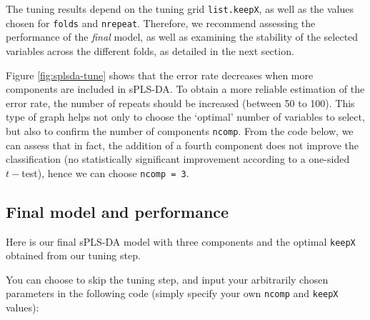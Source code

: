 \documentclass[
]{book}
\newenvironment{Shaded}{\begin{snugshade}}{\end{snugshade}}
\newcommand{\CommentTok}[1]{\textcolor[rgb]{0.56,0.35,0.01}{\textit{#1}}}
\newcommand{\NormalTok}[1]{#1}
\newcommand{\SpecialCharTok}[1]{\textcolor[rgb]{0.00,0.00,0.00}{#1}}
\begin{document}
The tuning results depend on the tuning grid \texttt{list.keepX}, as well as the values chosen for \texttt{folds} and \texttt{nrepeat}. Therefore, we recommend assessing the performance of the \emph{final} model, as well as examining the stability of the selected variables across the different folds, as detailed in the next section.

Figure \ref{fig:splsda-tune} shows that the error rate decreases when more components are included in sPLS-DA. To obtain a more reliable estimation of the error rate, the number of repeats should be increased (between 50 to 100). This type of graph helps not only to choose the `optimal' number of variables to select, but also to confirm the number of components \texttt{ncomp}. From the code below, we can assess that in fact, the addition of a fourth component does not improve the classification (no statistically significant improvement according to a one-sided \(t-\)test), hence we can choose \texttt{ncomp\ =\ 3}.

\begin{Shaded}
\end{Shaded}

\hypertarget{final-splsda-perf}{%
\subsection{Final model and performance}\label{final-splsda-perf}}

Here is our final sPLS-DA model with three components and the optimal \texttt{keepX} obtained from our tuning step.

You can choose to skip the tuning step, and input your arbitrarily chosen parameters in the following code (simply specify your own \texttt{ncomp} and \texttt{keepX} values):
\end{document}
